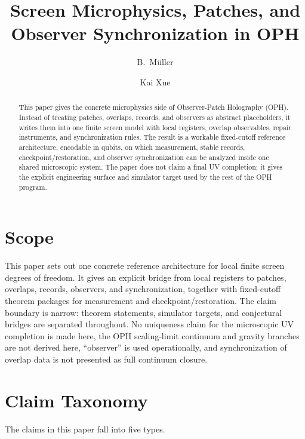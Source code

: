 \documentclass[11pt]{article}
\title{Screen Microphysics, Patches, and Observer Synchronization in OPH}
\author{B.\ M\"uller \and Kai Xue}
\date{\OPHPaperReleaseDate}
\begin{document}
\maketitle
\OPHPaperReleaseBanner

\begin{abstract}
This paper gives the concrete microphysics side of Observer-Patch Holography (OPH). Instead of treating patches, overlaps, records, and observers as abstract placeholders, it writes them into one finite screen model with local registers, overlap observables, repair instruments, and synchronization rules. The result is a workable fixed-cutoff reference architecture, encodable in qubits, on which measurement, stable records, checkpoint/restoration, and observer synchronization can be analyzed inside one shared microscopic system. The paper does not claim a final UV completion; it gives the explicit engineering surface and simulator target used by the rest of the OPH program.
\end{abstract}

\tableofcontents
\newpage

\section{Scope}

This paper sets out one concrete reference architecture for local finite screen degrees of
freedom. It gives an explicit bridge from local registers to patches, overlaps, records,
observers, and synchronization, together with fixed-cutoff theorem packages for measurement and
checkpoint/restoration. The claim boundary is narrow: theorem statements, simulator targets, and
conjectural bridges are separated throughout. No uniqueness claim for the microscopic UV
completion is made here, the OPH scaling-limit continuum and gravity branches are not derived
here, ``observer'' is used operationally, and synchronization of overlap data is not presented as
full continuum closure.

\section{Claim Taxonomy}

The claims in this paper fall into five types.
\end{document}
